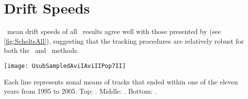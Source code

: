 


\section{Drift Speeds}

~mean drift speeds of all \AVI~results agree well with those presented by \citet{Chelton2011} (see \cref{fig:ScheltsAll}), suggesting that the tracking procedures are relatively robust for both the \MI~and \MII~methods.

\begin{marginfigure}
	\label{fig:UsubSampledAviIAviIIPop7II}
	\texttt{[image: UsubSampledAviIAviIIPop7II]}
	\caption{Each line represents zonal means of tracks that ended within one of the eleven years from 1995 to 2005. Top: \aviI. Middle: \aviII. Bottom:  \popSevenII.}
\end{marginfigure}

